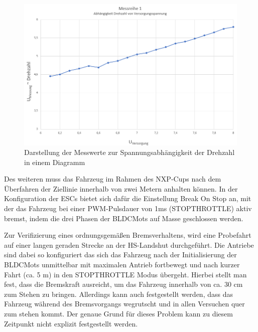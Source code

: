 \begin{figure}[H] %
\includegraphics[width=.90\textwidth]{sec4/images/PruefstandMess02} 
\centering
\captionsetup{width=.95\textwidth}
\caption [Diagramm 1: Spannungsabhängigkeit Drehzahl]{Darstellung der Messwerte zur Spannungsabhängigkeit der Drehzahl in einem Diagramm}\centering
\label{fig:Pruefstand02}
\end{figure}

Des weiteren muss das Fahrzeug im Rahmen des NXP-Cups nach dem Überfahren der Ziellinie innerhalb von zwei Metern anhalten können. In der Konfiguration der \acp{ESC} bietet sich dafür die Einstellung \glqq{}Break On Stop\grqq{} an, mit der das Fahrzeug bei einer PWM-Pulsdauer von 1ms (STOPTHROTTLE) aktiv bremst, indem die drei Phasen der \acp{BLDCMot} auf Masse geschlossen werden.\vspace{11pt}

Zur Verifizierung eines ordnungsgemäßen Bremsverhaltens, wird eine Probefahrt auf einer langen geraden Strecke an der HS-Landshut durchgeführt. Die Antriebe sind dabei so konfiguriert das sich das Fahrzeug nach der Initialisierung der \acp{BLDCMot} unmittelbar mit maximalen Antrieb fortbewegt und nach kurzer Fahrt (ca. 5 m) in den \glqq{}STOPTHROTTLE\grqq{} Modus übergeht. Hierbei stellt man fest, dass die Bremskraft ausreicht, um das Fahrzeug innerhalb von ca. 30 cm zum Stehen zu bringen. Allerdings kann auch festgestellt werden, dass das Fahrzeug während des Bremsvorgangs wegrutscht und in allen Versuchen quer zum stehen kommt. Der genaue Grund für dieses Problem kann zu diesem Zeitpunkt nicht explizit festgestellt werden.\vspace{11pt}

